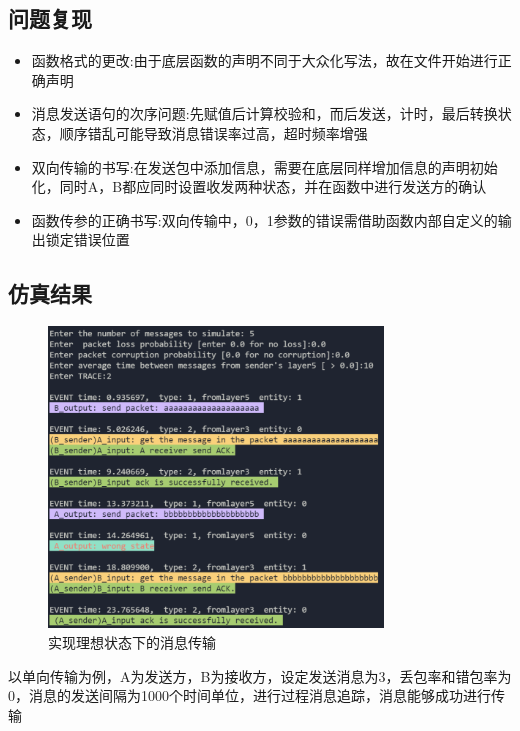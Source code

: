 \documentclass[UTF8,14pt]{article}
\numberwithin{figure}{section}
\begin{document}
\subsection{问题复现}
\begin{itemize}
      \setlength{\parskip}{-5mm}
      \item {函数格式的更改:\quad}由于底层函数的声明不同于大众化写法，故在文件开始进行正确声明\\
      \item {消息发送语句的次序问题:\quad}先赋值后计算校验和，而后发送，计时，最后转换状态，顺序错乱可能导致消息错误率过高，超时频率增强\\
      \item {双向传输的书写:\quad}在发送包中添加信息，需要在底层同样增加信息的声明初始化，同时A，B都应同时设置收发两种状态，并在函数中进行发送方的确认\\
      \item {函数传参的正确书写:\quad}双向传输中，0，1参数的错误需借助函数内部自定义的输出锁定错误位置\\
\end{itemize}
\vspace*{-0.8cm}
\newpage
\subsection{仿真结果}
\vspace*{-1cm}
\begin{figure}[!htbp]
      \centering
      \setlength{\abovecaptionskip}{0.cm}
      \includegraphics[width=8.9cm,height=8cm]{figures/result2.png}
      \caption{实现理想状态下的消息传输}
\end{figure}

以单向传输为例，A为发送方，B为接收方，设定发送消息为3，丢包率和错包率为0，消息的发送间隔为1000个时间单位，进行过程消息追踪，消息能够成功进行传输
\vspace*{-0.5cm}
\end{document}
